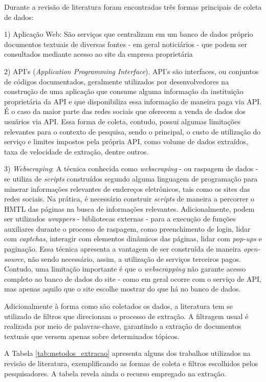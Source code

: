 Durante a revisão de literatura foram encontradas três formas principais de coleta de dados:

1) Aplicação Web: São serviços que centralizam em um banco de dados próprio documentos textuais de diversas fontes - em geral noticiários - que podem ser consultados mediante acesso ao site da empresa proprietária 

2) API's (\textit{Application Programming Interface}). API's são interfaces, ou conjuntos de códigos documentados, geralmente utilizados por desenvolvedores na construção de uma aplicação que consume alguma informação da instituição proprietária da API e que disponibiliza essa informação de maneira paga via API. É o caso da maior parte das redes sociais que oferecem a venda de dados dos usuários via API. Essa forma de coleta, contudo, possui algumas limitações relevantes para o contexto de pesquisa, sendo o principal, o custo de utilização do serviço e limites impostos pela própria API, como volume de dados extraídos, taxa de velocidade de extração, dentre outros.

3) \textit{Webscraping}: A técnica conhecida como \textit{webscraping} - ou raspagem de dados - se utiliza de \textit{scripts} construídos segundo alguma linguagem de programação para minerar informações relevantes de endereços eletrônicos, tais como os sites das redes sociais. Na prática, é necessário construir \textit{scripts} de maneira a percorrer o HMTL das páginas na busca de informações relevantes. Adicionalmente, podem ser utilizados \textit{wrappers} - bibliotecas externas - para a execução de funções auxiliares durante o processo de raspagem, como preenchimento de login, lidar com \textit{captchas}, interagir com elementos dinâmicos das páginas, lidar com \textit{pop-ups} e paginação. Essa técnica apresenta a vantagem de ser construída de maneira \textit{open-source}, não sendo necessário, assim, a utilização de serviços terceiros pagos. Contudo, uma limitação importante é que o \textit{webscrapping} não garante acesso completo ao banco de dados do site - como em geral ocorre com o serviço de API, mas apenas aquilo que o site escolhe mostrar do que há no banco de dados. 

Adicionalmente à forma como são coletados os dados, a literatura tem se utilizado de filtros que direcionam o processo de extração. A filtragem usual é realizada por meio de palavras-chave, garantindo a extração de documentos textuais que versem apenas sobre determinados tópicos.

A Tabela \ref{tab:metodos_extracao} apresenta alguns dos trabalhos utilizados na revisão de literatura, exemplificando as formas de coleta e filtros escolhidos pelos pesquisadores. A tabela revela ainda o recurso empregado na extração. 

